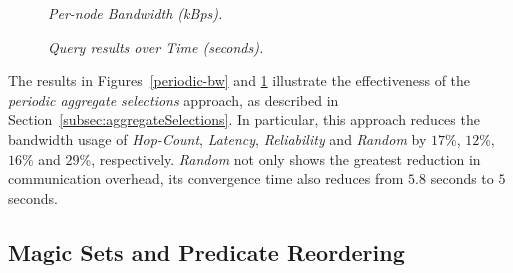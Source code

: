 
\begin{figure}[ht]
\centering
 \begin{minipage}{.45\linewidth}
  \begin{center}
    \small{\caption{\label{periodic-bw}\emph{\small Per-node Bandwidth (kBps).}}}
    \end{center}
 \end{minipage}
\hfill
 \begin{minipage}{.45\linewidth}
  \begin{center}
    \small{\caption{\label{periodic-convergence}\emph{\small
    Query results over Time (seconds).}}}
  \end{center}
 \end{minipage}
\end{figure}

The results in Figures~\ref{periodic-bw} and
\ref{periodic-convergence} illustrate the effectiveness of 
the {\em periodic aggregate selections} approach, as described in
Section~\ref{subsec:aggregateSelections}.  In particular, this
approach reduces the bandwidth usage of {\em Hop-Count}, {\em
Latency}, {\em Reliability} and {\em Random} by $17$\%, $12$\%, $16$\%
and $29$\%, respectively. {\em Random} not only shows the greatest
reduction in communication overhead, its convergence time also reduces from $5.8$
seconds to $5$ seconds. 


\subsection{Magic Sets and Predicate Reordering}
\label{subsec:expr:caching}

